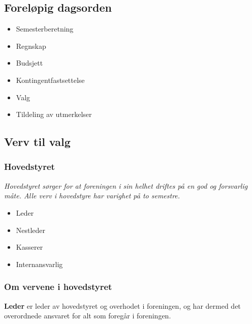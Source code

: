 \documentclass[12pt, norsk, a4paper]{proc}
\providecommand{\tightlist}{%
  \setlength{\itemsep}{0pt}\setlength{\parskip}{0pt}}
\begin{document}
\hypertarget{foreluxf8pig-dagsorden}{%
\subsection*{Foreløpig dagsorden}\label{foreluxf8pig-dagsorden}}

\begin{itemize}
\tightlist
\item
  Semesterberetning
\item
  Regnskap
\item
  Budsjett
\item
  Kontingentfastsettelse
\item
  Valg
\item
  Tildeling av utmerkelser
\end{itemize}

\hypertarget{verv-til-valg}{%
\subsection*{Verv til valg}\label{verv-til-valg}}

\hypertarget{hovedstyret}{%
\subsubsection*{Hovedstyret}\label{hovedstyret}}

\emph{Hovedstyret sørger for at foreningen i sin helhet driftes på en
god og forsvarlig måte. Alle verv i hovedstyre har varighet på to
semestre.}

\begin{itemize}
\tightlist
\item
  Leder
\item
  Nestleder
 \item
  Kasserer
\item
  Internansvarlig
\end{itemize}

\hypertarget{om-vervene-i-hovedstyret}{%
\subsubsection*{Om vervene i hovedstyret}\label{om-vervene-i-hovedstyret}}

\textbf{Leder} er leder av hovedstyret og overhodet i foreningen, og har dermed det overordnede ansvaret for alt som foregår i foreningen.
\end{document}
